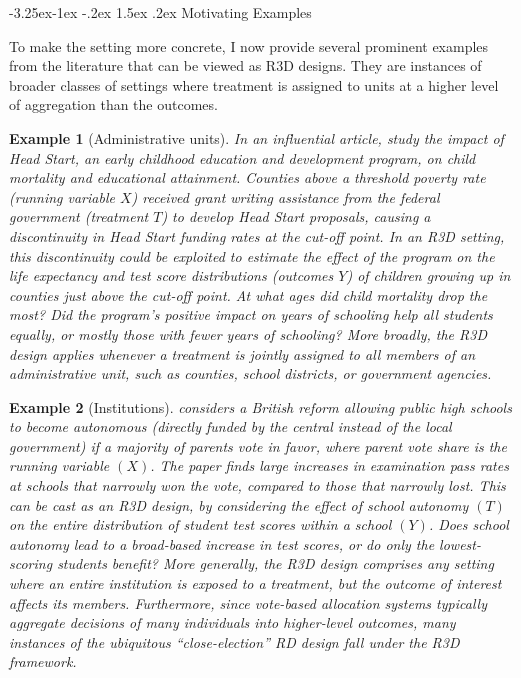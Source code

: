 \documentclass[12pt]{article}
\makeatletter
\renewcommand\subsection{\@startsection{subsection}{2}{\z@}%
  {-3.25ex\@plus -1ex \@minus -.2ex}%
  {1.5ex \@plus .2ex}%
  {\itshape\large\center}} %
\newtheorem{example}{Example}
\makeatother
\begin{document}
\subsection{Motivating Examples} \label{sec:examples}

To make the setting more concrete, I now provide several prominent examples from the literature that can be viewed as R3D designs. They are instances of broader classes of settings where treatment is assigned to units at a higher level of aggregation than the outcomes.


\begin{example}[Administrative units] 
\label{ex:admin}
In an influential article, \citet{ludwig2007does} study the impact of Head Start, an early childhood education and development program, on child mortality and educational attainment. Counties above a threshold poverty rate (running variable $X$) received grant writing assistance from the federal government (treatment $T$) to develop Head Start proposals, causing a discontinuity in Head Start funding rates at the cut-off point. In an R3D setting, this discontinuity could be exploited to estimate the effect of the program on the life expectancy and test score distributions (outcomes $Y$) of children growing up in counties just above the cut-off point. At what ages did child mortality drop the most? Did the program's positive impact on years of schooling help all students equally, or mostly those with fewer years of schooling? More broadly, the R3D design applies whenever a treatment is jointly assigned to all members of an administrative unit, such as counties, school districts, or government agencies. 
\end{example}



\begin{example}[Institutions] \label{ex:institution}
 \citet{clark2009performance} considers a British reform allowing public high schools to become autonomous (directly funded by the central instead of the local government) if a majority of parents vote in favor, where parent vote share is the running variable $(X)$. The paper finds large increases in examination pass rates at schools that narrowly won the vote, compared to those that narrowly lost. This can be cast as an R3D design, by considering the effect of school autonomy $(T)$ on the entire distribution of student test scores within a school $(Y)$. Does school autonomy lead to a broad-based increase in test scores, or do only the lowest-scoring students benefit? More generally, the R3D design comprises any setting where an entire institution is exposed to a treatment, but the outcome of interest affects its members. Furthermore, since vote-based allocation systems typically aggregate decisions of many individuals into higher-level outcomes, many instances of the ubiquitous ``close-election'' RD design fall under the R3D framework.
\end{example}
\end{document}
